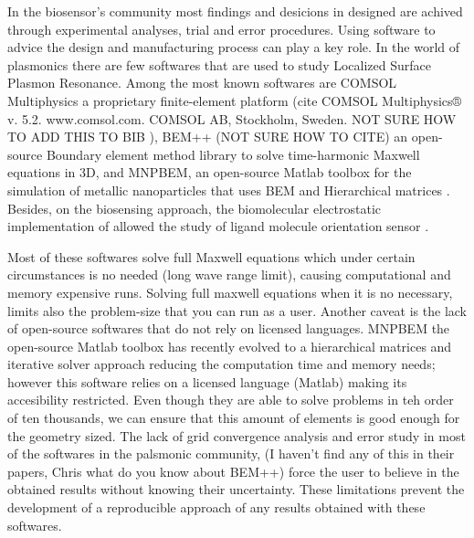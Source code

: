 
In the biosensor's community most findings and desicions in designed are achived 
through experimental analyses, trial and error procedures. Using
software to advice the design and manufacturing process can play a key role. In 
the world of plasmonics there are few softwares that are used to study Localized
Surface Plasmon Resonance. Among the most known softwares are COMSOL Multiphysics
a proprietary finite-element platform ({\color{red}cite COMSOL Multiphysics® v. 5.2. 
www.comsol.com. COMSOL AB, Stockholm, Sweden. NOT SURE HOW TO ADD THIS TO BIB} ), 
BEM++ ({\color{red}NOT SURE HOW TO CITE}) an open-source Boundary element method
library to solve time-harmonic Maxwell equations in 3D, and 
MNPBEM, an open-source Matlab toolbox for the simulation of metallic nanoparticles that
uses BEM and Hierarchical matrices \cite{Hohenester2018}. Besides, on the 
biosensing approach, the biomolecular electrostatic implementation of 
\pygbe \cite{CooperETal2016} allowed the study of ligand molecule orientation 
sensor \cite{CooperClementiBarba2015}.




Most of these softwares solve full Maxwell equations which under certain
circumstances is no needed (long wave range limit), causing computational and 
memory expensive runs. Solving full maxwell equations when it is no necessary, 
limits also the problem-size that you can run as a user. Another caveat is the
 lack of open-source softwares that do not rely on licensed
languages. MNPBEM the open-source Matlab toolbox has recently evolved to a hierarchical
matrices and iterative solver approach reducing the computation time and memory
needs; however this software relies on a licensed language (Matlab) making its
accesibility restricted. Even though they are able to solve problems in teh order
of ten thousands, we can ensure that this amount of elements is good enough for 
the geometry sized. The lack of grid convergence analysis and error study in most of the 
softwares in the palsmonic community,
{\color{red}(I haven't find any of this in their papers, Chris what do you know about BEM++)}
force the user to believe in the obtained results without knowing their uncertainty. These
limitations prevent the development of a reproducible approach of any results obtained
with these softwares. 



